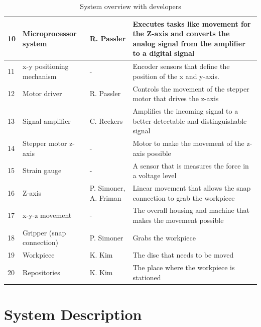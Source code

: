 \documentclass[a4paper,12pt]{scrreprt}
\begin{document}
\begin{table}[H]
\begin{tabular}{|p{0.5cm}|p{4cm}|p{2cm}|p{8cm}|}
10 & Microprocessor system     & R. Passler & Executes tasks like movement for the Z-axis and converts the analog signal from the amplifier to a digital signal \\ \hline
11 & x-y positioning mechanism & -          & Encoder sensors that define the position of the x and y-axis.                                                     \\ \hline
12 & Motor driver              & R. Passler & Controls the movement of the stepper motor that drives the z-axis                                                 \\ \hline
13 & Signal amplifier          & C. Reekers & Amplifies the incoming signal to a better detectable and distinguishable signal                                   \\ \hline
14 & Stepper motor z-axis      & -          & Motor to make the movement of the z-axis possible                                                                 \\ \hline
15 & Strain gauge              & -          & A sensor that is measures the force in a voltage level                                                            \\ \hline
16 & Z-axis                    &      P. Simoner, A. Friman     & Linear movement that allows the snap connection to grab the workpiece                                             \\ \hline
17 & x-y-z movement            & -          & The overall housing and machine that makes the movement possible                                                  \\ \hline
18 & Gripper (snap connection) &      P. Simoner      & Grabs the workpiece                                                                                               \\ \hline
19 & Workpiece                 & K. Kim           & The disc that needs to be moved                                                                                   \\ \hline
20 & Repositories              & K. Kim     & The place where the workpiece is stationed                                                                        \\ \hline
\end{tabular}
\caption{System overview with developers}
\label{tab:system overview with develop}
\end{table}


\chapter{System Description}
\end{document}
